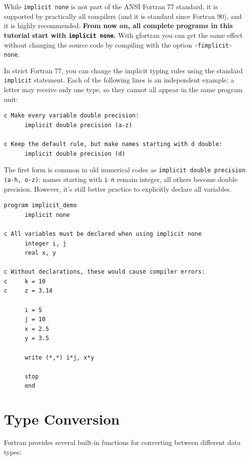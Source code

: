 While \texttt{implicit none} is not part of the ANSI Fortran 77 standard, it is supported by practically all compilers (and it is standard since Fortran 90), and it is highly recommended. \textbf{From now on, all complete programs in this tutorial start with \texttt{implicit none}.} With gfortran you can get the same effect without changing the source code by compiling with the option \texttt{-fimplicit-none}.

In strict Fortran 77, you can change the implicit typing rules using the standard \texttt{implicit} statement. Each of the following lines is an independent example; a letter may receive only one type, so they cannot all appear in the same program unit:

\begin{lstlisting}[style=fortran77]
c Make every variable double precision:
      implicit double precision (a-z)

c Keep the default rule, but make names starting with d double:
      implicit double precision (d)
\end{lstlisting}

The first form is common in old numerical codes as \texttt{implicit double precision (a-h, o-z)}: names starting with \texttt{i}--\texttt{n} remain integer, all others become double precision. However, it's still better practice to explicitly declare all variables.

\begin{lstlisting}[style=fortran77]
      program implicit_demo
      implicit none
      
c All variables must be declared when using implicit none
      integer i, j
      real x, y
      
c Without declarations, these would cause compiler errors:
c     k = 10
c     z = 3.14
      
      i = 5
      j = 10
      x = 2.5
      y = 3.5
      
      write (*,*) i*j, x*y
      
      stop
      end
\end{lstlisting}

\section{Type Conversion}

Fortran provides several built-in functions for converting between different data types:

